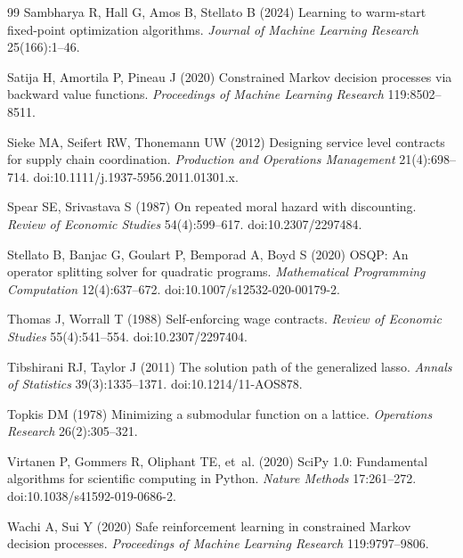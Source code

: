 \documentclass[11pt,letterpaper]{article}
\theoremstyle{definition}
\newcommand{\1}{\mathbf 1}
\begin{document}
\begin{thebibliography}{99}
Sambharya R, Hall G, Amos B, Stellato B (2024) Learning to warm-start fixed-point optimization algorithms. \emph{Journal of Machine Learning Research} 25(166):1--46.

Satija H, Amortila P, Pineau J (2020) Constrained Markov decision processes via backward value functions. \emph{Proceedings of Machine Learning Research} 119:8502--8511.

Sieke MA, Seifert RW, Thonemann UW (2012) Designing service level contracts for supply chain coordination. \emph{Production and Operations Management} 21(4):698--714. doi:10.1111/j.1937-5956.2011.01301.x.

Spear SE, Srivastava S (1987) On repeated moral hazard with discounting. \emph{Review of Economic Studies} 54(4):599--617. doi:10.2307/2297484.

Stellato B, Banjac G, Goulart P, Bemporad A, Boyd S (2020) OSQP: An operator splitting solver for quadratic programs. \emph{Mathematical Programming Computation} 12(4):637--672. doi:10.1007/s12532-020-00179-2.

Thomas J, Worrall T (1988) Self-enforcing wage contracts. \emph{Review of Economic Studies} 55(4):541--554. doi:10.2307/2297404.

Tibshirani RJ, Taylor J (2011) The solution path of the generalized lasso. \emph{Annals of Statistics} 39(3):1335--1371. doi:10.1214/11-AOS878.

Topkis DM (1978) Minimizing a submodular function on a lattice. \emph{Operations Research} 26(2):305--321.



Virtanen P, Gommers R, Oliphant TE, et~al. (2020) SciPy 1.0: Fundamental algorithms for scientific computing in Python. \emph{Nature Methods} 17:261--272. doi:10.1038/s41592-019-0686-2.

Wachi A, Sui Y (2020) Safe reinforcement learning in constrained Markov decision processes. \emph{Proceedings of Machine Learning Research} 119:9797--9806.


\end{thebibliography}


\label{r19-reference-end}
\end{document}
